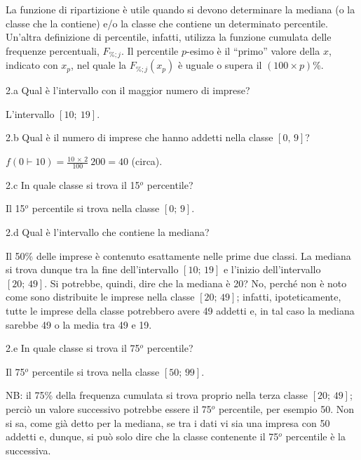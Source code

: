 \documentclass[
  11pt,
]{book}
\theoremstyle{mytheoremstyle}
\theoremstyle{mydefstyle}
\newenvironment{sol}
  {
  \begin{tcolorbox}[enhanced,breakable,arc=0.1mm,boxrule=1pt,colback=white,colframe=iblue,
  title=\bf \fontfamily{lmss}\selectfont \hspace{.5 cm} Soluzione,drop fuzzy shadow]

}{
\end{tcolorbox}
  }
\begin{document}
\begin{sol}
La funzione di ripartizione è utile quando si devono determinare
la mediana (o la classe che la contiene) e/o la classe che contiene
un determinato percentile.
Un'altra definizione di percentile, infatti, utilizza la
funzione cumulata delle frequenze percentuali, \(F_{\%; j}\).
Il percentile \(p\)-esimo è il ``primo'' valore della \(x\),
indicato con \(x_{p}\), nel quale la \(F_{\%; j}(x_{p})\) è uguale
o supera il \((100 \times p)\)\%.

\end{sol}

2.a Qual è l'intervallo con il maggior numero di imprese?

\begin{sol}
L'intervallo \([10;\ 19]\).

\end{sol}

2.b Qual è il numero di imprese che hanno addetti
nella classe \([0,\, 9]\)?

\begin{sol}
\(f\left( 0 \vdash 10 \right) = \frac{10 \,\times\, 2} {100}\ 200 = 40\) (circa).

\end{sol}

2.c In quale classe si trova il 15\(^{o}\) percentile?

\begin{sol}
Il 15\(^{o}\) percentile si trova nella classe \([0;\, 9]\).

\end{sol}

2.d Qual è l'intervallo che contiene la mediana?

\begin{sol}
Il 50\% delle imprese è contenuto esattamente nelle prime due classi.
La mediana si trova dunque tra la fine dell'intervallo
\([10;\, 19]\) e l'inizio dell'intervallo \([20;\, 49]\).
Si potrebbe, quindi, dire che la mediana è 20?
No, perché non è noto come sono distribuite le imprese nella classe
\([20;\, 49]\); infatti, ipoteticamente, tutte le imprese della classe
potrebbero avere 49 addetti e, in tal caso la mediana sarebbe 49 o
la media tra 49 e 19.

\end{sol}

2.e In quale classe si trova il 75\(^{o}\) percentile?

\begin{sol}
Il 75\(^{o}\) percentile si trova nella classe \([50;\, 99]\).

NB: il 75\% della frequenza cumulata si trova proprio nella terza
classe \([20;\, 49]\); perciò un valore successivo potrebbe essere
il 75\(^{o}\) percentile, per esempio 50.
Non si sa, come già detto per la mediana, se tra i dati vi sia
una impresa con 50 addetti e, dunque, si può solo dire che la
classe contenente il 75\(^{o}\) percentile è la successiva.

\end{sol}
\end{document}
